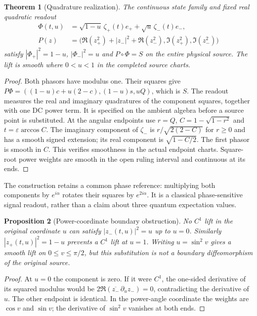 \documentclass[11pt]{article}
\newtheorem{theorem}{Theorem}[section]
\newtheorem{proposition}[theorem]{Proposition}
\theoremstyle{remark}\newtheorem{remark}[theorem]{Remark}
\begin{document}
\begin{theorem}[Quadrature realization]\label{thm:realization}
The continuous state family and fixed real quadratic readout
\begin{align*}
 \Phi(t,u)&=\sqrt{1-u}\,\zeta_+(t)e_+
                 +\sqrt u\,\zeta_-(t)e_-,\\
 P(z)&=\bigl(\Re(z_+^2)+|z_-|^2+\Re(z_-^2),
                   \Im(z_+^2),\Im(z_-^2)\bigr)
\end{align*}
satisfy $|\Phi_+|^2=1-u$, $|\Phi_-|^2=u$ and $P\circ\Phi=S$
on the entire physical source. The lift is smooth where $0<u<1$ in
the completed source charts.
\end{theorem}
\begin{proof}
Both phasors have modulus one. Their squares give
$P\Phi=((1-u)c+u(2-c),(1-u)s,uQ)$, which is $S$.
The readout measures the real and imaginary quadratures of the component
squares, together with one DC power term. It is specified on the ambient
algebra before a source point is substituted.
At the angular endpoints use $r=Q$, $C=1-\sqrt{1-r^2}$ and
$t=\varepsilon\arccos C$. The imaginary component of $\zeta_-$ is
$r/\sqrt{2(2-C)}$ for $r\geq0$ and has a smooth signed extension;
its real component is $\sqrt{1-C/2}$. The first phasor is smooth in $C$.
This verifies smoothness in the actual endpoint charts. Square-root power
weights are smooth in the open ruling interval and continuous at its ends.
\end{proof}

The construction retains a common phase reference: multiplying both
components by $e^{i\alpha}$ rotates their squares by $e^{2i\alpha}$.
It is a classical phase-sensitive signal readout, rather than a claim about
three quantum expectation values.

\begin{proposition}[Power-coordinate boundary obstruction]\label{prop:powerboundary}
No $C^1$ lift in the original coordinate $u$ can satisfy $|z_-(t,u)|^2=u$
up to $u=0$. Similarly $|z_+(t,u)|^2=1-u$ prevents a $C^1$ lift at $u=1$.
Writing $u=\sin^2v$ gives a smooth lift on $0\leq v\leq\pi/2$,
but this substitution is not a boundary diffeomorphism of the original source.
\end{proposition}
\begin{proof}
At $u=0$ the component is zero. If it were $C^1$, the one-sided derivative
of its squared modulus would be
$2\Re(\overline{z_-}\,\partial_u z_-)=0$, contradicting the derivative of $u$.
The other endpoint is identical. In the power-angle coordinate the weights
are $\cos v$ and $\sin v$; the derivative of $\sin^2v$ vanishes at both ends.
\end{proof}
\end{document}
